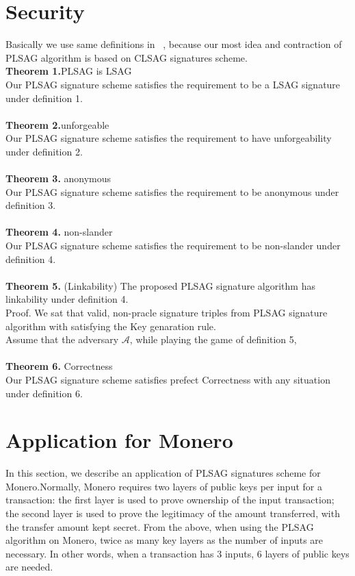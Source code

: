 \section{Security}
    Basically we use same definitions in ~\cite{clsag}, because our most idea and contraction of PLSAG algorithm is based on CLSAG signatures scheme.\\
    \textbf{Theorem 1.}PLSAG is LSAG\\
    Our PLSAG signature scheme satisfies the requirement to be a LSAG signature under definition 1.\\
    \\
    \textbf{Theorem 2.}unforgeable\\
    Our PLSAG signature scheme satisfies the requirement to have unforgeability under definition 2.\\
    \\
    \textbf{Theorem 3.} anonymous\\
    Our PLSAG signature scheme satisfies the requirement to be anonymous under definition 3.\\
    \\
    \textbf{Theorem 4.} non-slander\\
    Our PLSAG signature scheme satisfies the requirement to be non-slander under definition 4.\\
    \\
    \textbf{Theorem 5.} (Linkability) The proposed PLSAG signature algorithm has linkability under definition 4.\\
    Proof. We sat that valid, non-pracle signature triples from PLSAG signature algorithm with satisfying the Key genaration rule.\\
    Assume that the adversary $\mathcal A $, while playing the game of definition 5, \\
    \\
    \textbf{Theorem 6.} Correctness\\
    Our PLSAG signature scheme satisfies prefect Correctness with any situation under definition 6.\\

\section{Application for Monero}
     In this section, we describe an application of PLSAG signatures scheme for Monero.Normally, Monero requires two layers of public keys per input for a transaction: the first layer is used to prove ownership of the input transaction; the second layer is used to prove the legitimacy of the amount transferred, with the transfer amount kept secret. From the above, when using the PLSAG algorithm on Monero, twice as many key layers as the number of inputs are necessary. In other words, when a transaction has 3 inputs, 6 layers of public keys are needed. 


